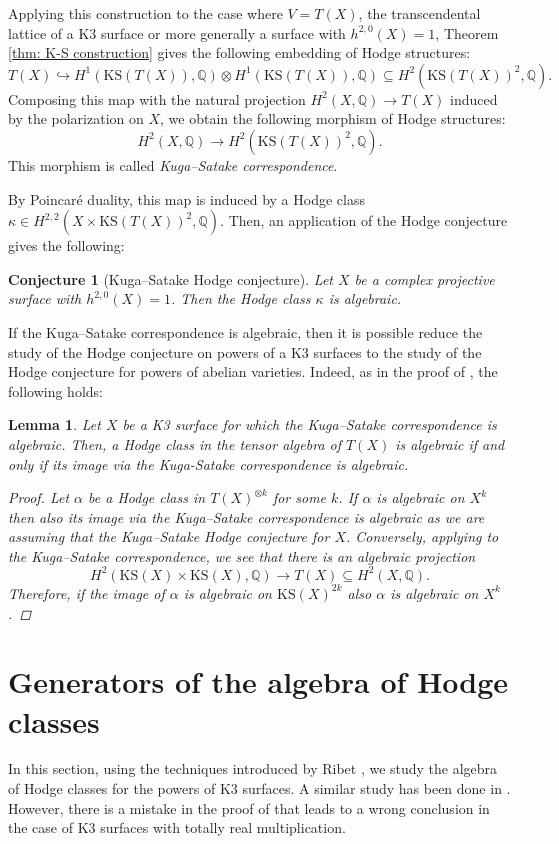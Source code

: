 \documentclass[11pt,twoside,a4paper]{amsart}
\newcommand{\0}{\mathscr{O}}
\newcommand{\Q}{\mathbb{Q}}
\theoremstyle{plain}
\newtheorem{lem}[thm]{Lemma}
\newtheorem{conj}[thm]{Conjecture}
\theoremstyle{definition}
\theoremstyle{remark}
\begin{document}
\smallskip

Applying this construction to the case where $V=T(X)$, the transcendental lattice of a K3 surface or more generally a surface with $h^{2,0}(X)=1$, Theorem \ref{thm: K-S construction} gives the following embedding of Hodge structures:
\[
T(X)\hookrightarrow H^1(\mathrm{KS}(T(X)),\Q)\otimes H^1(\mathrm{KS}(T(X)),\Q)\subseteq H^2(\mathrm{KS}(T(X))^2,\Q).
\]
Composing this map with the natural projection $H^2(X,\Q)\rightarrow T(X)$ induced by the polarization on $X$, we obtain the following morphism of Hodge structures:
\[H^2(X,\Q) \rightarrow  H^2(\mathrm{KS}(T(X))^2,\Q).\]
This morphism is called \textit{Kuga--Satake correspondence}.

By Poincaré duality, this map is induced by a Hodge class $\kappa\in H^{2,2}(X\times \mathrm{KS}(T(X))^2,\Q)$.
Then, an application of the Hodge conjecture gives the following:
\begin{conj}[Kuga--Satake Hodge conjecture]
Let $X$ be a complex projective surface with $h^{2,0}(X)=1$. Then the Hodge class $\kappa$ is algebraic. 
\end{conj}
If the Kuga--Satake correspondence is algebraic, then it is possible reduce the study of the Hodge conjecture on powers of a K3 surfaces to the study of the Hodge conjecture for powers of abelian varieties. Indeed, as in the proof of \cite[Thm. 2]{schlickewei2010hodge}, the following holds:
\begin{lem}
\label{Lem.: Kuga-Satake corresponedence and Hodge conjecture}
Let $X$ be a K3 surface for which the Kuga--Satake correspondence is algebraic. Then, a Hodge class in the tensor algebra of $T(X)$ is algebraic if and only if its image via the Kuga-Satake correspondence is algebraic.
\begin{proof}
Let $\alpha$ be a Hodge class in $T(X)^{\otimes k}$ for some $k$. If $\alpha$ is algebraic on $X^k$ then also its image via the Kuga--Satake correspondence is algebraic as we are assuming that the Kuga--Satake Hodge conjecture for $X$. Conversely, applying \cite[Cor.\ 3.14]{kleiman1968algebraic} to the Kuga--Satake correspondence, we see that there is an algebraic projection 
\[
H^2(\mathrm{KS}(X)\times \mathrm{KS}(X),\Q)\rightarrow T(X)\subseteq H^2(X,\Q).
\]
Therefore, if the image of $\alpha$ is algebraic on $\mathrm{KS}(X)^{2k}$ also $\alpha$ is algebraic on $X^k$.
\end{proof}
\end{lem}

\section{Generators of the algebra of Hodge classes}
\label{Section: On generators of the algebra of Hodge classes}
In this section, using the techniques introduced by Ribet \cite{ribet1983hodge}, we study the algebra of Hodge classes for the powers of K3 surfaces. A similar study has been done in \cite{mari2008hodge}. However, there is a mistake in the proof of \cite[Prop.\ 5.2]{mari2008hodge} that leads to a wrong conclusion in the case of K3 surfaces with totally real multiplication.
\end{document}
